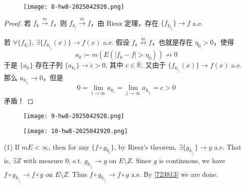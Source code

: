 \begin{exercise}
\begin{figure}[H]
\centering
\texttt{[image: 8-hw8-2025042920.png]}
\label{}
\end{figure}\label{723813}
\end{exercise}

\begin{proof}
若 $f_k\overset{ m }{ \to }f$，则 $f_{k_i}\overset{ m }{ \to }f$，由 Riesz 定理，存在 $\{ f_{k_{i_j}} \}\to f$ a.e.

若 $\forall \{ f_{k_i} \}$, $\exists \{ f_{k_{i_{j}}}(x) \}\to f(x)$ a.e. 假设 $f_k \overset{ m }{ \not\to }f$，也就是存在 $\eta_0>0$，使得
\[
a_k\coloneqq m(E(\lvert f_k-f \rvert >\eta_0))\not\to0
\]
于是 $\{ a_k \}$ 存在子列 $\{ a_{k_i} \}\to c>0$, 其中 $c\in \overline{\mathbb{R}}$. 又由于 $\{ f_{k_{i_j}}(x) \}\to f(x)$ a.e. 那么 $a_{k_{i_j}}\to0$，但是
\[
0=\lim_{ i \to \infty } a_{k_i}=\lim_{ j \to \infty } a_{k_{i_j}}=c>0
\]
矛盾！
\end{proof}

\begin{exercise}
\begin{figure}[H]
\centering
\texttt{[image: 9-hw8-2025042920.png]}
\label{}
\end{figure}
\begin{figure}[H]
\centering
\texttt{[image: 10-hw8-2025042920.png]}
\label{}
\end{figure}
\end{exercise}
(1)
If $mE<\infty$, then for any $\{ f \circ g_{k_i} \}$, by Riesz's theorem, $\exists \{ g_{k_{i_j}} \}\to g$ a.e. That is, $\exists Z$ with measure 0, s.t. $g_{k_{i_j}}\to g$ on $E\setminus Z$. Since $g$ is continuous, we have $f\circ g_{k_{i_j}}\to f\circ g$ on $E\setminus Z$. Thus $f\circ g_{k_{i_j}}\to f\circ g$ a.e. By \cref{723813} we are done.

